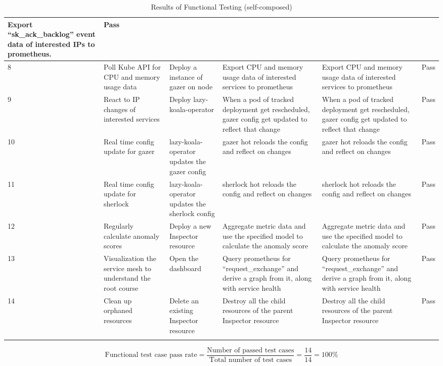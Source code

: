 \begin{longtable}{|p{3mm}|p{30mm}|p{27mm}|p{33mm}|p{33mm}|p{10mm}|}
      Export “sk\_ack\_backlog” event data of interested IPs to prometheus. &
      Pass \\ \hline
    8 &
      Poll Kube API for CPU and memory usage data &
      Deploy a instance of \ac{gazer} on node &
      Export CPU and memory usage data of interested services to prometheus &
      Export CPU and memory usage data of interested services to prometheus &
      Pass \\ \hline
    9 &
      React to IP changes of interested services &
      Deploy \ac{lazy-koala-operator} &
      When a pod of tracked deployment get rescheduled, gazer config get updated to reflect that change &
      When a pod of tracked deployment get rescheduled, gazer config get updated to reflect that change &
      Pass \\ \hline
    10 &
      Real time config update for \ac{gazer} &
      \ac{lazy-koala-operator} updates the \ac{gazer} config &
      \ac{gazer} hot reloads the config and reflect on changes &
      \ac{gazer} hot reloads the config and reflect on changes &
      Pass \\ \hline
    11 &
      Real time config update for \ac{sherlock} &
      \ac{lazy-koala-operator} updates the \ac{sherlock} config &
      \ac{sherlock} hot reloads the config and reflect on changes &
      \ac{sherlock} hot reloads the config and reflect on changes &
      Pass \\ \hline
    12 &
      Regularly calculate anomaly scores &
      Deploy a new Inspector resource &
      Aggregate metric data and use the specified model to calculate the anomaly score &
      Aggregate metric data and use the specified model to calculate the anomaly score &
      Pass \\ \hline
    13 &
      Visualization the service mesh to understand the root course &
      Open the dashboard &
      Query prometheus for “request\_exchange” and derive a graph from it, along with service health &
      Query prometheus for “request\_exchange” and derive a graph from it, along with service health &
      Pass \\ \hline
    14 &
      Clean up orphaned resources &
      Delete an existing Inspector resource &
      Destroy all the child resources of the parent Inspector resource &
      Destroy all the child resources of the parent Inspector resource &
      Pass \\ \hline

      \caption{Results of Functional Testing (self-composed)}
\end{longtable}

\begingroup
\setlength{\abovedisplayskip}{-0.5cm}
\[
\text{Functional test case pass rate} = \frac{\text{Number of passed test cases}}{\text{Total number of test cases}} = \frac{14}{14} = 100\%
\]
\endgroup